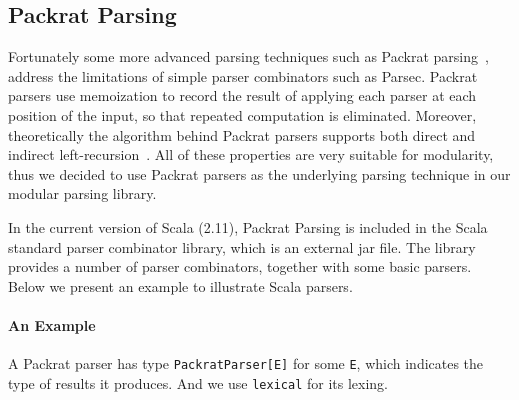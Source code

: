 \subsection{Packrat Parsing}
Fortunately some more advanced parsing techniques such as Packrat parsing~\cite{Ford2002}, address the limitations of simple parser combinators such as Parsec. Packrat parsers use memoization to record the result of applying each parser at each position of the input, so that repeated computation is eliminated.  Moreover, theoretically the algorithm behind Packrat parsers supports both direct and indirect left-recursion~\cite{warth2008}. All of these properties are very suitable for modularity, thus we decided to use Packrat parsers as the underlying parsing technique in our modular parsing library.
\begin{comment}
It is worth mentioning that the choice of parser combinators will not
affect the other parts of our library. One can choose other parser
combinators like Parsec, in cases that the performance and supporting
of left-recursion are not major concerns. A different library can even build a new
\name with fancy features or higher efficiency.
\end{comment}
In the current version of Scala (2.11), Packrat Parsing is included
in the Scala standard parser combinator library, which is an external jar file. The library provides a number of
parser combinators, together with some basic parsers. Below we present an example to illustrate Scala parsers.


\paragraph{An Example}
A Packrat parser has type \lstinline{PackratParser[E]} for some
\lstinline{E}, which indicates the type of results it produces.
And we use \lstinline{lexical} for its lexing.

